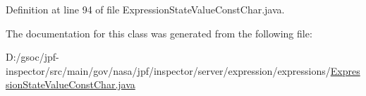 Definition at line 94 of file Expression\+State\+Value\+Const\+Char.\+java.



The documentation for this class was generated from the following file\+:\begin{DoxyCompactItemize}
\item 
D\+:/gsoc/jpf-\/inspector/src/main/gov/nasa/jpf/inspector/server/expression/expressions/\hyperlink{_expression_state_value_const_char_8java}{Expression\+State\+Value\+Const\+Char.\+java}\end{DoxyCompactItemize}
